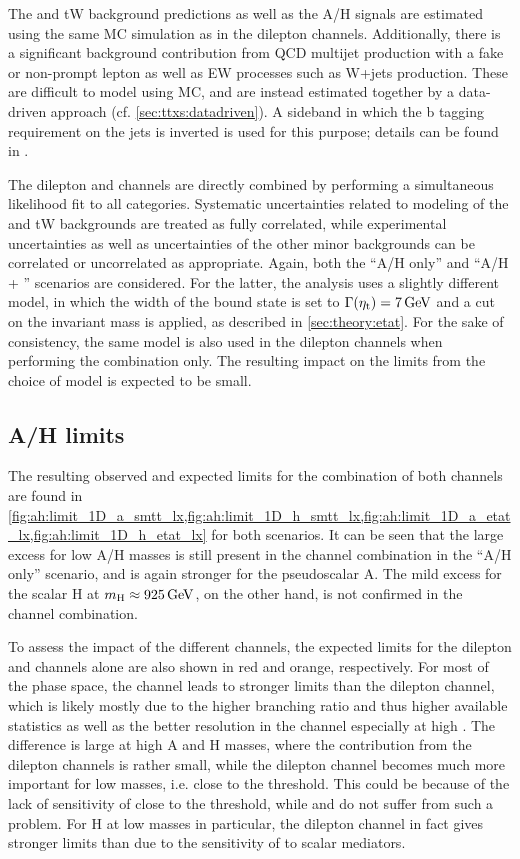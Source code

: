 The \ttbar and tW background predictions as well as the A/H signals are estimated using the same MC simulation as in the dilepton channels. Additionally, there is a significant background contribution from QCD multijet production with a fake or non-prompt lepton as well as EW processes such as W+jets production. These are difficult to model using MC, and are instead estimated together by a data-driven approach (cf. \cref{sec:ttxs:datadriven}). A sideband in which the b tagging requirement on the jets is inverted is used for this purpose; details can be found in .

The dilepton and \ljets channels are directly combined by performing a simultaneous likelihood fit to all categories. Systematic uncertainties related to modeling of the \ttbar and tW backgrounds are treated as fully correlated, while experimental uncertainties as well as uncertainties of the other minor backgrounds can be correlated or uncorrelated as appropriate. Again, both the ``A/H only'' and ``A/H + \etat'' scenarios are considered. For the latter, the \ljets analysis uses a slightly different \etat model, in which the width of the bound state is set to $\Gammaetat = \SI{7}{\GeV}$ and a cut on the invariant mass \mWWbb is applied, as described in \cref{sec:theory:etat}. For the sake of consistency, the same model is also used in the dilepton channels when performing the combination only. The resulting impact on the limits from the choice of \etat model is expected to be small. 

\subsection{A/H limits}
\label{sec:ah:combinedlimits}

The resulting observed and expected limits for the combination of both channels are found in \cref{fig:ah:limit_1D_a_smtt_lx,fig:ah:limit_1D_h_smtt_lx,fig:ah:limit_1D_a_etat_lx,fig:ah:limit_1D_h_etat_lx} for both scenarios. It can be seen that the large excess for low A/H masses is still present in the channel combination in the ``A/H only'' scenario, and is again stronger for the pseudoscalar A. The mild excess for the scalar H at $\mH \approx \SI{925}{\GeV}$, on the other hand, is not confirmed in the channel combination.

To assess the impact of the different channels, the expected limits for the dilepton and \ljets channels alone are also shown in red and orange, respectively. For most of the phase space, the \ljets channel leads to stronger limits than the dilepton channel, which is likely mostly due to the higher branching ratio and thus higher available statistics as well as the better \mtt resolution in the \ljets channel especially at high \mtt. The difference is large at high A and H masses, where the contribution from the dilepton channels is rather small, while the dilepton channel becomes much more important for low masses, i.e. close to the \ttbar threshold. This could be because of the lack of sensitivity of \abscostl close to the \ttbar threshold, while \chel and \chan do not suffer from such a problem. For H at low masses in particular, the dilepton channel in fact gives stronger limits than \ljets due to the sensitivity of \chan to scalar mediators.

